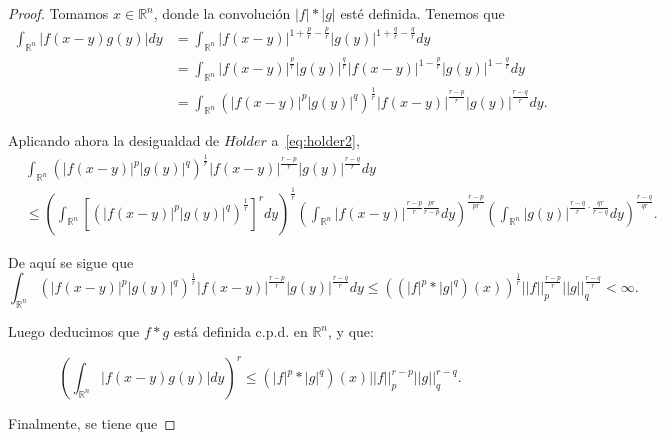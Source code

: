 \begin{proof}
Tomamos $x \in \mathbb{R}^n$, donde la convolución $|f|*|g|$ esté definida. Tenemos que 
\begin{equation}
\begin{aligned}\label{eq:holder2}
    \int_{\mathbb{R}^n}|f(x-y)g(y)| dy &= \int_{\mathbb{R}^n}|f(x-y)|^{1+\frac{p}{r}-\frac{p}{r}}|g(y)|^{1+\frac{q}{r}-\frac{q}{r}}dy \\
    &=\int_{\mathbb{R}^n}|f(x-y)|^{\frac{p}{r}}|g(y)|^{\frac{q}{r}}|f(x-y)|^{1-\frac{p}{r}}|g(y)|^{1-\frac{q}{r}}dy
    \\
    &= \int_{\mathbb{R}^n}(|f(x-y)|^{p}|g(y)|^{q})^\frac{1}{r}|f(x-y)|^{\frac{r-p}{r}}|g(y)|^{\frac{r-q}{r}}dy.
\end{aligned}
\end{equation}


Aplicando ahora la desigualdad de $H\ddot{o}lder$ a~\eqref{eq:holder2},
\begin{equation}
\begin{aligned}
&\textstyle \int_{\mathbb{R}^n}(|f(x-y)|^{p}|g(y)|^{q})^\frac{1}{r}|f(x-y)|^{\frac{r-p}{r}}|g(y)|^{\frac{r-q}{r}}dy \\
&\textstyle \leq \left(\textstyle \int_{\mathbb{R}^n}\left[(|f(x-y)|^{p}|g(y)|^{q})^\frac{1}{r}\right]^r dy\right)^{\frac{1}{r}}  \left(\textstyle \int_{\mathbb{R}^n}|f(x-y)|^{\frac{r-p}{r}\frac{pr}{r-p}}dy\right)^{\frac{r-p}{pr}} \left(\textstyle \int_{\mathbb{R}^n}|g(y)|^{\frac{r-q}{r}\cdot\frac{qr}{r-q}}dy\right)^{\frac{r-q}{qr}}.
\end{aligned}
\end{equation}

De aquí se sigue que 
\begin{equation}
\int_{\mathbb{R}^n}(|f(x-y)|^{p}|g(y)|^{q})^\frac{1}{r}|f(x-y)|^{\frac{r-p}{r}}|g(y)|^{\frac{r-q}{r}}dy \leq  \left((|f|^p*|g|^q)(x)\right)^\frac{1}{r}||f||_{p}^{\frac{r-p}{r}}||g||_{q}^{\frac{r-q}{r}}< \infty.
\end{equation}

Luego deducimos que $f*g$ está definida c.p.d. en $\mathbb{R}^n$, y que:

\begin{equation}
\left(\int_{\mathbb{R}^n}|f(x-y)g(y)| dy\right)^r \leq (|f|^p*|g|^q)(x)||f||_{p}^{r-p}||g||_{q}^{r-q} .
\end{equation}

Finalmente, se tiene que 


\end{proof}
